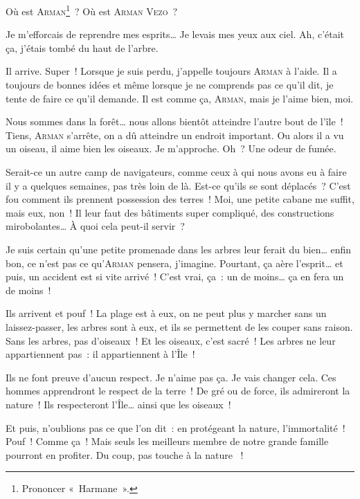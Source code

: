 {
    Où est \textsc{Arman}\footnote{Prononcer «~Harmane~».}~?  Où est \textsc{Arman Vezo}~?

    Je m’efforcais de reprendre mes esprits…  Je levais mes yeux aux ciel.
    Ah, c’était ça, j’étais tombé du haut de l’arbre.

    Il arrive.  Super~!
    Lorsque je suis perdu, j’appelle toujours \textsc{Arman} à l’aide.  Il a toujours de bonnes idées et même lorsque je ne comprends pas ce qu’il dit, je tente de faire ce qu’il demande.
    Il est comme ça, \textsc{Arman}, mais je l’aime bien, moi.

    Nous sommes dans la forêt… nous allons bientôt atteindre l’autre bout de l’île~!
    Tiens, \textsc{Arman} s’arrête, on a dû atteindre un endroit important.
    Ou alors il a vu un oiseau, il aime bien les oiseaux.
    Je m’approche.  Oh~?  Une odeur de fumée.

    Serait-ce un autre camp de navigateurs, comme ceux à qui nous avons eu à faire il y a quelques semaines, pas très loin de là.
    Est-ce qu’ils se sont déplacés~?
    C’est fou comment ils prennent possession des terres~!  Moi, une petite cabane me suffit, mais eux, non~!  Il leur faut des bâtiments super compliqué, des constructions mirobolantes…
    À quoi cela peut-il servir~?

    Je suis certain qu’une petite promenade dans les arbres leur ferait du bien… enfin bon, ce n’est pas ce qu’\textsc{Arman} pensera, j’imagine.
    Pourtant, ça aère l’esprit… et puis, un accident est si vite arrivé~!
    C’est vrai, ça~:  un de moins… ça en fera un de moins~!

    Ils arrivent et pouf~!  La plage est à eux, on ne peut plus y marcher sans un laissez-passer, les arbres sont à eux, et ils se permettent de les couper sans raison.
    Sans les arbres, pas d’oiseaux~!  Et les oiseaux, c’est sacré~!
    Les arbres ne leur appartiennent pas~:  il appartiennent à l’Île~!

    Ils ne font preuve d’aucun respect.  Je n’aime pas ça.  Je vais changer cela.
    Ces hommes apprendront le respect de la terre~!  De gré ou de force, ils admireront la nature~!  Ils respecteront l’Île… ainsi que les oiseaux~!

    Et puis, n’oublions pas ce que l’on dit~:  en protégeant la nature, l’immortalité~!  Pouf~!  Comme ça~!
    Mais seuls les meilleurs membre de notre grande famille pourront en profiter.  Du coup, pas touche à la nature ~!

}
